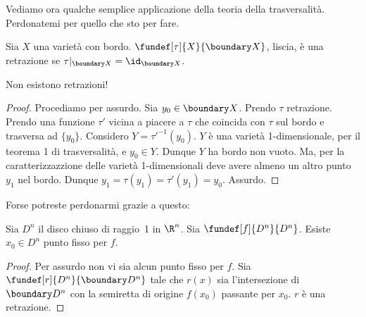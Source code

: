 Vediamo ora qualche semplice applicazione della teoria della trasversalità.
Perdonatemi per quello che sto per fare.

\begin{defn}[Retrazione]
Sia $X$ una varietà con bordo. $\fundef[\tau]{X}{\boundary X}$, liscia, è una retrazione se $\tau|_{\boundary X}=\id_{\boundary X}$.
\end{defn}

\begin{teo}
Non esistono retrazioni!
\end{teo}
\begin{proof}
Procediamo per assurdo. Sia $y_0 \in \boundary X$. Prendo $\tau$ retrazione. Prendo una funzione $\tau'$ vicina a piacere a $\tau$ che coincida con $\tau$ sul bordo e trasversa ad $\{y_0\}$. Considero $Y=\tau'^{-1}(y_0)$. $Y$ è una varietà 1-dimensionale, per il teorema 1 di trasversalità, e $y_0\in Y$. Dunque $Y$ ha bordo non vuoto. Ma, per la caratterizzazzione delle varietà 1-dimensionali deve avere almeno un altro punto $y_1$ nel bordo. Dunque $y_1=\tau(y_1)=\tau'(y_1)=y_0$. Assurdo.  
\end{proof}
Forse potreste perdonarmi grazie a questo:
\begin{teo}
Sia $D^n$ il disco chiuso di raggio~1 in $\R^n$. Sia $\fundef[f]{D^n}{D^n}$. Esiste $x_0\in D^n$ punto fisso per $f$.
\end{teo}
\begin{proof}
Per assurdo non vi sia alcun punto fisso per $f$. Sia $\fundef[r]{D^n}{\boundary D^n}$ tale che $r(x)$ sia l'intersezione di $\boundary D^n$ con la semiretta di origine $f(x_0)$ passante per $x_0$. $r$ è una retrazione. 
\end{proof}

\begin{center}
\end{center}





